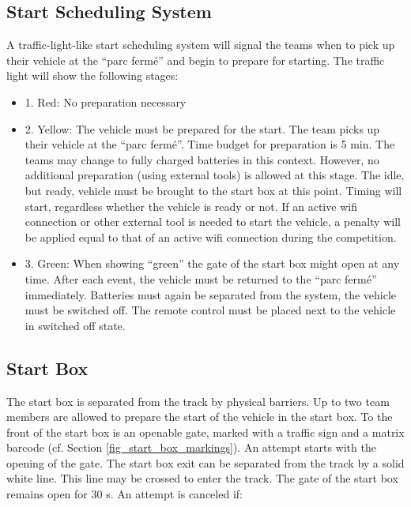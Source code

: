 \subsection{Start Scheduling System}
\label{start_scheduling}

A traffic-light-like start scheduling system will signal the teams when to pick
up their vehicle at the “parc fermé” and begin to prepare for starting. The
traffic light will show the following stages:

\begin{itemize}
	\item 1. Red: No preparation necessary

	\item 2. Yellow: The vehicle must be prepared for the start. The team picks up their vehicle at the “parc fermé”. Time budget for preparation is 5 min. The teams may change to fully charged batteries in this context. However, no additional preparation (using external tools) is allowed at this stage. The idle, but ready, vehicle must be brought to the start box at this point. Timing will start, regardless whether the vehicle is ready or not. If an active wifi connection or other external tool is needed to start the vehicle, a penalty will be applied equal to that of an active wifi connection during the competition.

	\item 3. Green: When showing “green” the gate of the start box might open at any time. After each event, the vehicle must be returned to the “parc fermé” immediately. Batteries must again be separated from the system, the vehicle must be switched off. The remote control must be placed next to the vehicle in switched off state.
\end{itemize}

\subsection{Start Box}
\label{start_box}

The start box is separated from the track by physical barriers. Up to two team
members are allowed to prepare the start of the vehicle in the start box. To
the front of the start box is an openable gate, marked with a traffic sign and
a matrix barcode (cf. Section \ref{fig_start_box_markings}). An attempt starts
with the opening of the gate. The start box exit can be separated from the
track by a solid white line. This line may be crossed to enter the track. The
gate of the start box remains open for 30 s. An attempt is canceled if:


